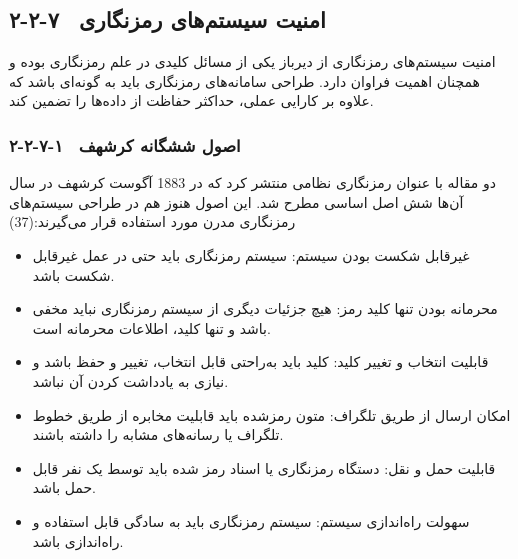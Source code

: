 \subsection{۲-۲-۷  امنیت سیستم‌های رمزنگاری}

امنیت سیستم‌های رمزنگاری از دیرباز یکی از مسائل کلیدی در علم رمزنگاری بوده و همچنان اهمیت فراوان دارد. طراحی سامانه‌های رمزنگاری باید به گونه‌ای باشد که علاوه بر کارایی عملی، حداکثر حفاظت از داده‌ها را تضمین کند.

\subsubsection{۲-۲-۷-۱  اصول ششگانه کرشهف}

آگوست کرشهف در سال ‎1883‎ دو مقاله با عنوان رمزنگاری نظامی منتشر کرد که در آن‌ها شش اصل اساسی مطرح شد. این اصول هنوز هم در طراحی سیستم‌های رمزنگاری مدرن مورد استفاده قرار می‌گیرند:(37)

\begin{itemize}
    \item غیرقابل شکست بودن سیستم: سیستم رمزنگاری باید حتی در عمل غیرقابل شکست باشد.
\end{itemize}

\begin{itemize}
    \item محرمانه بودن تنها کلید رمز: هیچ جزئیات دیگری از سیستم رمزنگاری نباید مخفی باشد و تنها کلید، اطلاعات محرمانه است.
\end{itemize}

\begin{itemize}
    \item قابلیت انتخاب و تغییر کلید: کلید باید به‌راحتی قابل انتخاب، تغییر و حفظ باشد و نیازی به یادداشت کردن آن نباشد.
\end{itemize}

\begin{itemize}
    \item امکان ارسال از طریق تلگراف: متون رمزشده باید قابلیت مخابره از طریق خطوط تلگراف یا رسانه‌های مشابه را داشته باشند.
\end{itemize}

\begin{itemize}
    \item قابلیت حمل و نقل: دستگاه رمزنگاری یا اسناد رمز شده باید توسط یک نفر قابل حمل باشد.
\end{itemize}

\begin{itemize}
    \item سهولت راه‌اندازی سیستم: سیستم رمزنگاری باید به سادگی قابل استفاده و راه‌اندازی باشد.
\end{itemize}


